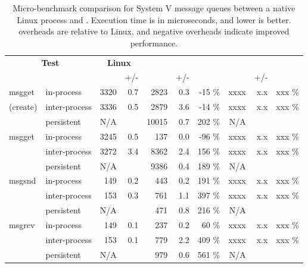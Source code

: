 \begin{table}[t!b!]
\footnotesize
\centering
\begin{tabular}{|ll|rr|rrr|rrr|}
\hline
\multicolumn{2}{|c|}{{\bf Test}} &
\multicolumn{2}{c|}{{\bf Linux}} &
\multicolumn{3}{c|}{{\bf \sysname{}}} &
\multicolumn{3}{c|}{{\bf \graphenesgx{}}} \\
 & & \us{} & +/- & \us{} & +/- & & \us{} & +/- & \\
\hline
msgget   & in-process    & 3320	& 0.7 &  2823 & 0.3 &	-15	\%	&  xxxx & x.x &	xxx	\%	\\
(create) & inter-process & 3336	& 0.5 &  2879 & 3.6 &	-14	\%	&  xxxx & x.x &	xxx	\%	\\
         & persistent    &  N/A	&     & 10015 & 0.7 &	202	\%	&   N/A &     &         \\
\hline								
msgget   & in-process    & 3245	& 0.5 &   137 & 0.0 &	-96	\%	&  xxxx & x.x &	xxx	\%	\\
         & inter-process & 3272	& 3.4 &  8362 & 2.4 &	156	\%	&  xxxx & x.x & xxx	\%	\\
         & persistent    &  N/A	&     &  9386 & 0.4 &	189	\%	&   N/A &     &         \\
\hline								
msgsnd   & in-process    &  149	& 0.2 &   443 & 0.2 &	191	\%	&  xxxx & x.x &	xxx	\%	\\
         & inter-process &  153	& 0.3 &   761 & 1.1 &	397	\%	&  xxxx & x.x & xxx	\%	\\
         & persistent    &  N/A	&     &   471 & 0.8 &	216	\%	&   N/A &     &         \\
\hline								
msgrcv   & in-process    &  149	& 0.1 &   237 & 0.2 &	60	\%	&  xxxx & x.x & xxx	\%	\\
         & inter-process &  153	& 0.1 &   779 & 2.2 &	409	\%  &  xxxx & x.x & xxx	\%	\\
         & persistent    &  N/A	&     &   979 & 0.6 &	561	\%	&   N/A &     &         \\ \hline
\end{tabular}
\caption[The \microbench{} results for System V message queues in Linux, KVM, and \sysname{}]
{Micro-benchmark comparison for System V message queues
between a native Linux process and \sysname{} \picoprocs{}.
Execution time is in microseconds, and lower is better.
overheads are relative to Linux, and negative overheads indicate improved performance. }
\label{tab:graphene:msgq}
\end{table}


